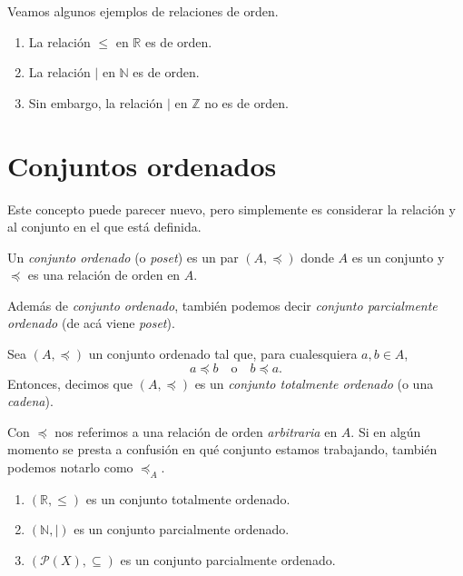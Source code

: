 Veamos algunos ejemplos de relaciones de orden.

\begin{example}
	\begin{enumerate}
		\item La relación $\leq$ en $\mathbb{R}$ es de orden.
		\item La relación $\mid$ en $\mathbb{N}$ es de orden.
		\item Sin embargo, la relación $\mid$ en $\mathbb{Z}$ no es de orden.
	\end{enumerate}
\end{example}


\section{Conjuntos ordenados}

Este concepto puede parecer nuevo, pero simplemente es considerar la relación y al conjunto en el que está definida.

\begin{definition}
	Un \emph{conjunto ordenado} (o \emph{poset}) es un par $(A, \preceq)$ donde $A$ es un conjunto y $\preceq$ es una relación de orden en $A$.
\end{definition}

Además de \textit{conjunto ordenado}, también podemos decir \textit{conjunto parcialmente ordenado} (de acá viene \textit{poset}).

\begin{definition}
	Sea $(A, \preceq)$ un conjunto ordenado tal que, para cualesquiera $a, b \in A$,
	\begin{equation*}
		a \preceq b \quad\text{o}\quad b \preceq a.
	\end{equation*}
	Entonces, decimos que $(A, \preceq)$ es un \emph{conjunto totalmente ordenado} (o una \emph{cadena}).
\end{definition}

Con $\preceq$ nos referimos a una relación de orden \textit{arbitraria} en $A$. Si en algún momento se presta a confusión en qué conjunto estamos trabajando, también podemos notarlo como $\preceq_{A}$.

\begin{example}
	\noindent
	\begin{enumerate}
		\item $(\mathbb{R}, \leq)$ es un conjunto totalmente ordenado.
		\item $(\mathbb{N}, \mid)$ es un conjunto parcialmente ordenado.
		\item $(\mathcal{P}(X), \subseteq)$ es un conjunto parcialmente ordenado.
	\end{enumerate}
\end{example}

